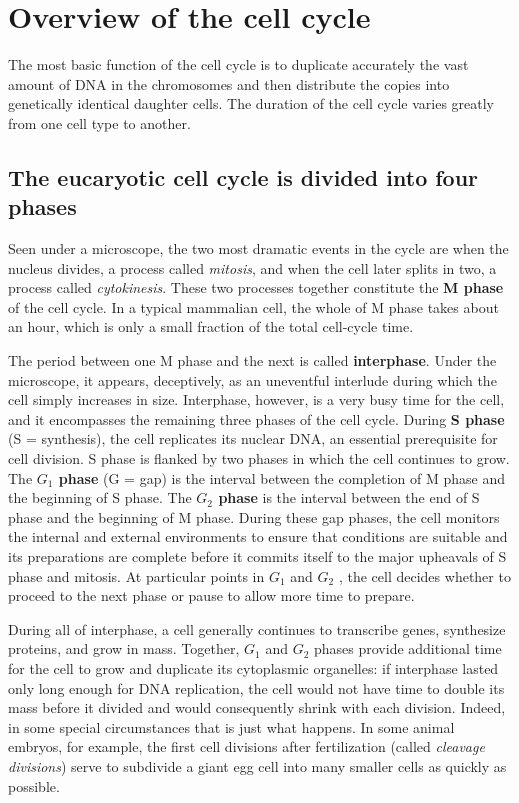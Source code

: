 \section{Overview of the cell cycle}

The most basic function of the cell cycle is to duplicate accurately the
vast amount of DNA in the chromosomes and then distribute the copies
into genetically identical daughter cells. The duration of the cell cycle
varies greatly from one cell type to another.

\subsection{The eucaryotic cell cycle is divided into four phases}

Seen under a microscope, the two most dramatic events in the cycle are
when the nucleus divides, a process called \textit{mitosis}, and when the cell later
splits in two, a process called \textit{cytokinesis}. These two processes together
constitute the \textbf{M phase} of the cell cycle. In a typical mammalian cell, the
whole of M phase takes about an hour, which is only a small fraction of
the total cell-cycle time.

The period between one M phase and the next is called \textbf{interphase}. Under
the microscope, it appears, deceptively, as an uneventful interlude during
which the cell simply increases in size. Interphase, however, is a very
busy time for the cell, and it encompasses the remaining three phases
of the cell cycle. During \textbf{S phase} (S = synthesis), the cell replicates its
nuclear DNA, an essential prerequisite for cell division. S phase is flanked
by two phases in which the cell continues to grow. The \textbf{$G_1$ phase} (G =
gap) is the interval between the completion of M phase and the beginning
of S phase. The \textbf{$G_2$ phase} is the interval between the end of S phase and
the beginning of M phase. During these gap phases, the cell
monitors the internal and external environments to ensure that conditions
are suitable and its preparations are complete before it commits
itself to the major upheavals of S phase and mitosis. At particular points
in $G_1$ and $G_2$ , the cell decides whether to proceed to the next phase or
pause to allow more time to prepare.

During all of interphase, a cell generally continues to transcribe genes,
synthesize proteins, and grow in mass. Together, $G_1$ and $G_2$ phases provide
additional time for the cell to grow and duplicate its cytoplasmic
organelles: if interphase lasted only long enough for DNA replication, the
cell would not have time to double its mass before it divided and would
consequently shrink with each division. Indeed, in some special circumstances
that is just what happens. In some animal embryos, for example,
the first cell divisions after fertilization (called \textit{cleavage divisions}) serve to
subdivide a giant egg cell into many smaller cells as quickly as possible.

